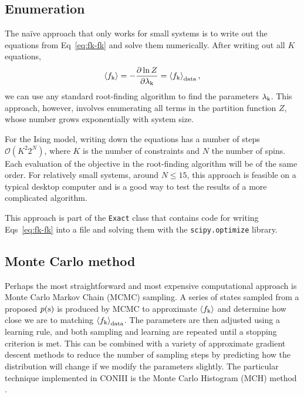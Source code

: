 \documentclass[aps,prl,twocolumn,nofootinbib]{revtex4-1}
\begin{document}
\subsection{Enumeration}
The na\"{i}ve approach that only works for small systems is to write out the equations from Eq~\ref{eq:fk-fk} and solve them numerically. After writing out all $K$ equations,
\begin{equation}
	\left<f_{\rm k}\right> = -\frac{\partial \ln Z}{\partial \lambda_{\rm k}} = \left<f_{\rm k}\right>_{\rm data} \\,
\end{equation}
we can use any standard root-finding algorithm to find the parameters $\lambda_{\rm k}$.
This approach, however, involves enumerating all terms in the partition function $Z$, whose number grows exponentially with system size.

For the Ising model, writing down the equations has a number of steps $\mathcal{O}(K^2 2^{N})$, where $K$ is the number of constraints and $N$ the number of spins.  Each evaluation of the objective in the root-finding algorithm will be of the same order. For relatively small systems, around $N\leq15$, this approach is feasible on a typical desktop computer and is a good way to test the results of a more complicated algorithm.

This approach is part of the {\tt Exact} class that contains code for writing Eqs~\ref{eq:fk-fk} into a file and solving them with the {\tt scipy.optimize} library.


\subsection{Monte Carlo method}
Perhaps the most straightforward and most expensive computational approach is Monte Carlo Markov Chain (MCMC) sampling.  A series of states sampled from a proposed $p({\rm s})$ is produced by MCMC to approximate $\left<f_{\rm k}\right>$ and determine how close we are to matching $\left<f_{\rm k}\right>_{\rm data}$.  The parameters are then adjusted using a learning rule, and both sampling and learning are repeated until a stopping criterion is met.
This can be combined with a variety of approximate gradient descent methods to reduce the number of sampling steps by predicting how the distribution will change if we modify the parameters slightly.
The particular technique implemented in CONIII is the Monte Carlo Histogram (MCH) method \cite{Broderick:2007wq}.
\end{document}
